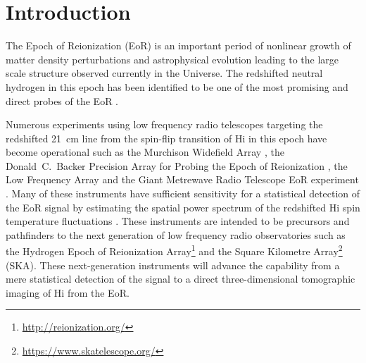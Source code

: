 \documentclass[preprint2,iop,numberedappendix,twocolappendix,appendixfloats]{emulateapj}
\begin{document}

\section{Introduction}\label{intro}


The Epoch of Reionization (EoR) is an important period of nonlinear growth of matter density perturbations and astrophysical evolution leading to the large scale structure observed currently in the Universe. The redshifted neutral hydrogen in this epoch has been identified to be one of the most promising and direct probes of the EoR \citep{sun72,sco90,mad97,toz00,ili02}. 

Numerous experiments using low frequency radio telescopes targeting the redshifted 21~cm line from the spin-flip transition of H{\sc i} in this epoch have become operational such as the Murchison Widefield Array \citep[MWA;][]{lon09,bow13,tin13}, the Donald~C.~Backer Precision Array for Probing the Epoch of Reionization \citep[PAPER;][]{par10}, the Low Frequency Array \citep[LOFAR;][]{van13} and the Giant Metrewave Radio Telescope EoR experiment \citep[GMRT;][]{pac13}. Many of these instruments have sufficient sensitivity for a statistical detection of the EoR signal by estimating the spatial power spectrum of the redshifted H{\sc i} spin temperature fluctuations \citep{bea13,thy13}. These instruments are intended to be precursors and pathfinders to the next generation of low frequency radio observatories such as the Hydrogen Epoch of Reionization Array\footnote{\url{http://reionization.org/}} \citep[HERA;][]{deb16} and the Square Kilometre Array\footnote{\url{https://www.skatelescope.org/}} (SKA). These next-generation instruments will advance the capability from a mere statistical detection of the signal to a direct three-dimensional tomographic imaging of H{\sc i} from the EoR. 
\end{document}
